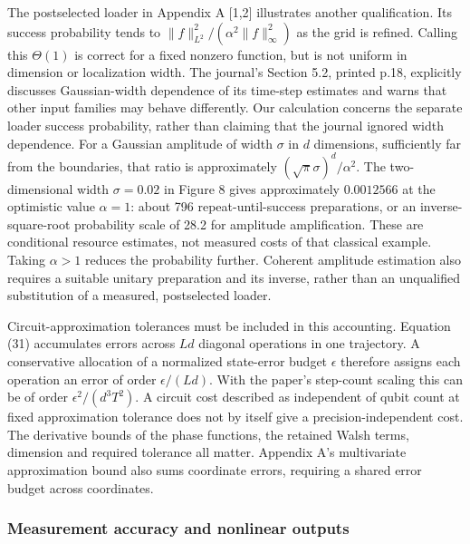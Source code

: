 The postselected loader in Appendix A {[}1,2{]} illustrates another
qualification. Its success probability tends to
\(\|f\|_{L^2}^2/(\alpha^2\|f\|_\infty^2)\) as the grid is refined.
Calling this \(\Theta(1)\) is correct for a fixed nonzero function, but
is not uniform in dimension or localization width. The journal's Section
5.2, printed p.18, explicitly discusses Gaussian-width dependence of its
time-step estimates and warns that other input families may behave
differently. Our calculation concerns the separate loader success
probability, rather than claiming that the journal ignored width
dependence. For a Gaussian amplitude of width \(\sigma\) in \(d\)
dimensions, sufficiently far from the boundaries, that ratio is
approximately \((\sqrt{\pi}\sigma)^d/\alpha^2\). The two-dimensional
width \(\sigma=0.02\) in Figure 8 gives approximately \(0.0012566\) at
the optimistic value \(\alpha=1\): about 796 repeat-until-success
preparations, or an inverse-square-root probability scale of 28.2 for
amplitude amplification. These are conditional resource estimates, not
measured costs of that classical example. Taking \(\alpha>1\) reduces
the probability further. Coherent amplitude estimation also requires a
suitable unitary preparation and its inverse, rather than an unqualified
substitution of a measured, postselected loader.

Circuit-approximation tolerances must be included in this accounting.
Equation (31) accumulates errors across \(Ld\) diagonal operations in
one trajectory. A conservative allocation of a normalized state-error
budget \(\epsilon\) therefore assigns each operation an error of order
\(\epsilon/(Ld)\). With the paper's step-count scaling this can be of
order \(\epsilon^2/(d^3T^2)\). A circuit cost described as independent
of qubit count at fixed approximation tolerance does not by itself give
a precision-independent cost. The derivative bounds of the phase
functions, the retained Walsh terms, dimension and required tolerance
all matter. Appendix A's multivariate approximation bound also sums
coordinate errors, requiring a shared error budget across coordinates.

\subsubsection{Measurement accuracy and nonlinear
outputs}\label{measurement-accuracy-and-nonlinear-outputs}

